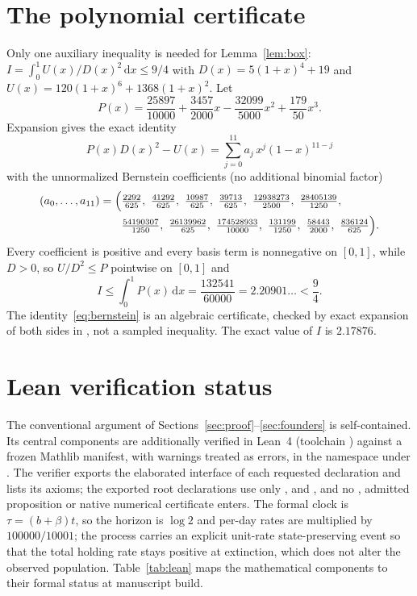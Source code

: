 \documentclass[11pt,a4paper]{article}
\theoremstyle{plain}
\theoremstyle{definition}
\theoremstyle{remark}
\newcommand{\dd}{\mathrm d}
\begin{document}
\appendix

\section{The polynomial certificate}\label{app:certificate}
Only one auxiliary inequality is needed for Lemma~\ref{lem:box}: $I=\int_0^1U(x)/D(x)^2\,\dd x\le9/4$ with $D(x)=5(1+x)^4+19$ and $U(x)=120(1+x)^6+1368(1+x)^2$. Let
\[
P(x)=\frac{25897}{10000}+\frac{3457}{2000}x-\frac{32099}{5000}x^2+\frac{179}{50}x^3 .
\]
Expansion gives the exact identity
\begin{equation}\label{eq:bernstein}
P(x)D(x)^2-U(x)=\sum_{j=0}^{11}a_j\,x^j(1-x)^{11-j}
\end{equation}
with the unnormalized Bernstein coefficients (no additional binomial factor)
\begin{align*}
(a_0,\dots,a_{11})=\Bigl(&\tfrac{2292}{625},\ \tfrac{41292}{625},\ \tfrac{10987}{625},\ \tfrac{39713}{625},\ \tfrac{12938273}{2500},\ \tfrac{28405139}{1250},\\
&\tfrac{54190307}{1250},\ \tfrac{26139962}{625},\ \tfrac{174528933}{10000},\ \tfrac{131199}{1250},\ \tfrac{58443}{2000},\ \tfrac{836124}{625}\Bigr).
\end{align*}
Every coefficient is positive and every basis term is nonnegative on $[0,1]$, while $D>0$, so $U/D^2\le P$ pointwise on $[0,1]$ and
\[
I\le\int_0^1P(x)\,\dd x=\frac{132541}{60000}=2.20901\ldots<\frac94 .
\]
The identity~\eqref{eq:bernstein} is an algebraic certificate, checked by exact expansion of both sides in , not a sampled inequality. The exact value of $I$ is $2.17876$.

\section{Lean verification status}\label{app:lean}
The conventional argument of Sections~\ref{sec:proof}--\ref{sec:founders} is self-contained. Its central components are additionally verified in Lean~4 (toolchain ) against a frozen Mathlib manifest, with warnings treated as errors, in the namespace  under . The verifier exports the elaborated interface of each requested declaration and lists its axioms; the exported root declarations use only ,  and , and no , admitted proposition or native numerical certificate enters. The formal clock is $\tau=(b+\beta)t$, so the horizon is $\log2$ and per-day rates are multiplied by $100000/10001$; the process carries an explicit unit-rate state-preserving event so that the total holding rate stays positive at extinction, which does not alter the observed population. Table~\ref{tab:lean} maps the mathematical components to their formal status at manuscript build.
\end{document}
